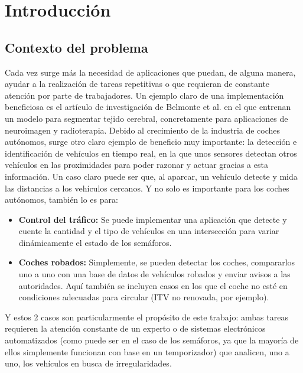 \documentclass[12pt,a4paper,onecolumn,oneside]{report}
\begin{document}
\newpage
\renewcommand{\thepage}{\arabic{page}}



\chapter{Introducción}
\label{Introducción}

\section{Contexto del problema}

Cada vez surge más la necesidad de aplicaciones que puedan, de alguna manera, ayudar a la realización de tareas repetitivas o que requieran de constante atención por parte de trabajadores. Un ejemplo claro de una implementación beneficiosa es el artículo de investigación de Belmonte et al. \cite{BELMONTE2025103154} en el que entrenan un modelo para segmentar tejido cerebral, concretamente para aplicaciones de neuroimagen y radioterapia. Debido al crecimiento de la industria de coches autónomos, surge otro claro ejemplo de beneficio muy importante: la detección e identificación de vehículos en tiempo real, en la que unos sensores detectan otros vehículos en las proximidades para poder razonar y actuar gracias a esta información. Un caso claro puede ser que, al aparcar, un vehículo detecte y mida las distancias a los vehículos cercanos. Y no solo es importante para los coches autónomos, también lo es para:
\begin{itemize}
    \item \textbf{Control del tráfico:} Se puede implementar una aplicación que detecte y cuente la cantidad y el tipo de vehículos en una intersección para variar dinámicamente el estado de los semáforos.
    \item \textbf{Coches robados:} Simplemente, se pueden detectar los coches, compararlos uno a uno con una base de datos de vehículos robados y enviar avisos a las autoridades. Aquí también se incluyen casos en los que el coche no esté en condiciones adecuadas para circular (ITV no renovada, por ejemplo).
\end{itemize}

Y estos 2 casos son particularmente el propósito de este trabajo: ambas tareas requieren la atención constante de un experto o de sistemas electrónicos automatizados (como puede ser en el caso de los semáforos, ya que la mayoría de ellos simplemente funcionan con base en un temporizador) que analicen, uno a uno, los vehículos en busca de irregularidades.
\end{document}
